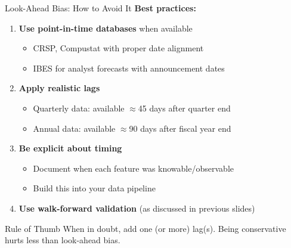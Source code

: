 \documentclass[10pt]{beamer}
\begin{document}
\begin{frame}{Look-Ahead Bias: How to Avoid It}
  \textbf{Best practices:}
  
  \vspace{0.5em}
  \begin{enumerate}
    \item \textbf{Use point-in-time databases} when available
    \begin{itemize}
      \item CRSP, Compustat with proper date alignment
      \item IBES for analyst forecasts with announcement dates
    \end{itemize}
    \vspace{0.3em}
    \item \textbf{Apply realistic lags}
    \begin{itemize}
      \item Quarterly data: available $\approx$45 days after quarter end
      \item Annual data: available $\approx$90 days after fiscal year end
    \end{itemize}
    \vspace{0.3em}
    \item \textbf{Be explicit about timing}
    \begin{itemize}
      \item Document when each feature was knowable/observable
      \item Build this into your data pipeline
    \end{itemize}
    \vspace{0.3em}
    \item \textbf{Use walk-forward validation} (as discussed in previous slides)
  \end{enumerate}
  
  \vspace{0.5em}
  \begin{block}{Rule of Thumb}
    When in doubt, add one (or more) lag(s). Being conservative hurts less than look-ahead bias.
  \end{block}
\end{frame}
\end{document}

